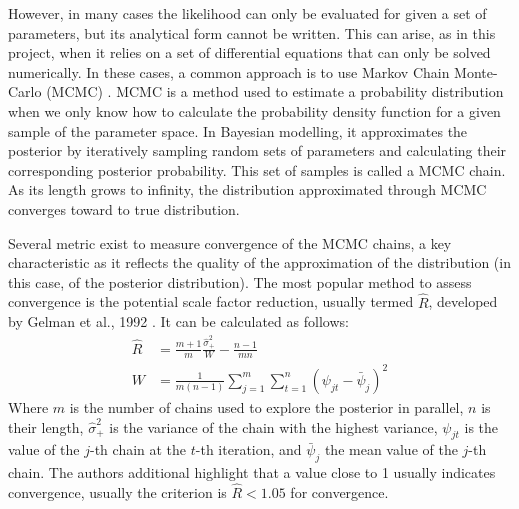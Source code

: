 \documentclass[11pt]{article}
\begin{document}
However, in many cases the likelihood can only be evaluated for given a set of parameters, but its analytical form cannot be written. This can arise, as in this project, when it relies on a set of differential equations that can only be solved numerically. In these cases, a common approach is to use Markov Chain Monte-Carlo (MCMC) \cite{mcmcTuto}. MCMC is a method used to estimate a probability distribution when we only know how to calculate the probability density function for a given sample of the parameter space. In Bayesian modelling, it approximates the posterior by iteratively sampling random sets of parameters and calculating their corresponding posterior probability. This set of samples is called a MCMC chain. As its length grows to infinity, the distribution approximated through MCMC converges toward to true distribution. 

Several metric exist to measure convergence of the MCMC chains, a key characteristic as it reflects the quality of the approximation of the distribution \cite{moins2023use} (in this case, of the posterior distribution). The most popular method to assess convergence is the potential scale factor reduction, usually termed $\hat{R}$, developed by Gelman et al., 1992 \cite{rhat}. It can be calculated as follows:
\begin{align*}
    \hat{R} &= \frac{m+1}{m}\frac{\hat{\sigma}^2_+}{W}-\frac{n-1}{mn} \\ 
    W &= \frac{1}{m(n-1)}\sum^m_{j=1}\sum^n_{t=1}(\psi_{jt}-\bar{\psi}_j)^2 
\end{align*}
Where $m$ is the number of chains used to explore the posterior in parallel, $n$ is their length, $\hat{\sigma}^2_+$ is the variance of the chain with the highest variance, $\psi_{jt}$ is the value of the $j$-th chain at the $t$-th iteration, and $\bar{\psi}_j$ the mean value of the $j$-th chain. The authors additional highlight that a value close to 1 usually indicates convergence, usually the criterion is $\hat{R}<1.05$ for convergence.
\end{document}
